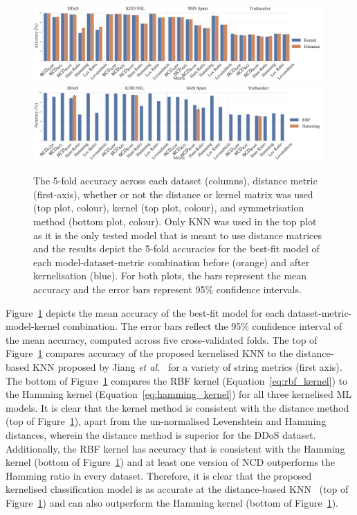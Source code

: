 \documentclass[preprint,12pt]{article}
\begin{document}
\begin{figure}[!htb]
    \centering
    \includegraphics[width=0.99\textwidth]{images/accuracy_vs_kernel.pdf}
    \hfill
    \includegraphics[width=0.99\textwidth]{images/accuracy_vs_rbf_or_hamming.pdf}
    \caption{
    The 5-fold accuracy across each dataset (columns), distance metric (first-axis), whether or not the distance or kernel matrix was used (top plot, colour), kernel (top plot, colour), and symmetrisation method (bottom plot, colour).
    Only KNN was used in the top plot as it is the only tested model that is meant to use distance matrices and the results depict the 5-fold accuracies for the best-fit model of each model-dataset-metric combination before (orange) and after kernelisation (blue).
    For both plots, the bars represent the mean accuracy and the error bars represent 95\% confidence intervals.
    }
    \label{fig:baseline}
\end{figure}


Figure~\ref{fig:baseline} depicts the mean accuracy of the best-fit model for each dataset-metric-model-kernel combination.
The error bars reflect the 95\% confidence interval of the mean accuracy, computed across five cross-validated folds.
The top of Figure~\ref{fig:baseline} compares accuracy of the proposed kernelised KNN to the distance-based KNN proposed by Jiang \textit{et al.}~\cite{jiang2022less} for a variety of string metrics (first axis).
The bottom of Figure~\ref{fig:baseline} compares the RBF kernel (Equation~\ref{eq:rbf_kernel}) to the Hamming kernel (Equation~\ref{eq:hamming_kernel}) for all three kernelised ML models.
It is clear that the kernel method is consistent with the distance method (top of Figure~\ref{fig:baseline}), apart from the un-normalised Levenshtein and Hamming distances, wherein the distance method is superior for the DDoS dataset.
Additionally, the RBF kernel has accuracy that is consistent with the Hamming kernel (bottom of Figure~\ref{fig:baseline}) and at least one version of NCD outperforms the Hamming ratio in every dataset.
Therefore, it is clear that the proposed kernelised classification model is as accurate at the distance-based KNN~\cite{jiang2022less} (top of Figure~\ref{fig:baseline}) and can also outperform the Hamming kernel (bottom of Figure~\ref{fig:baseline}).
\end{document}
